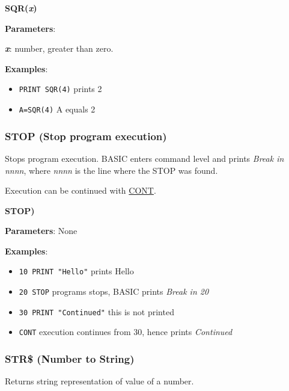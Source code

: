     \hspace{1.9cm}\textbf{SQR(\textit{x})}

    \textbf{Parameters}:

    \hspace{1cm}\textbf{\textit{x}}: number, greater than zero.

    \textbf{Examples}:
    \begin{itemize}
        \item \texttt{PRINT SQR(4)} prints 2
        \item \texttt{A=SQR(4)} A equals 2
    \end{itemize}

    \subsubsection{{STOP (Stop program execution)}}
    \label{msbasic:lang:stop}
    Stops program execution. BASIC enters command level and prints
    \textit{Break in nnnn}, where \textit{nnnn} is the line where the STOP was
    found.

    Execution can be continued with \hyperref[msbasic:lang:cont]{CONT}.

    \hspace{1.9cm}\textbf{STOP)}

    \textbf{Parameters}: None

    \textbf{Examples}:
    \begin{itemize}
        \item \texttt{10 PRINT "Hello"} prints Hello
        \item \texttt{20 STOP} programs stops, BASIC prints \textit{Break in 20}
        \item \texttt{30 PRINT "Continued"} this is not printed
        \item \texttt{CONT} execution continues from 30, hence prints
        \textit{Continued}
    \end{itemize}

    \subsubsection{{STR\$ (Number to String)}}
    \label{msbasic:lang:str}
    Returns string representation of value of a number.

